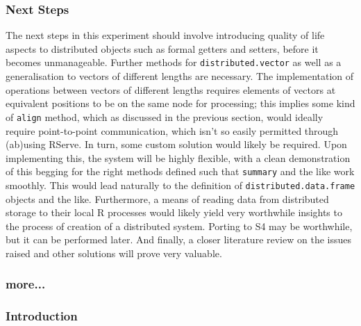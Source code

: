 \hypertarget{next-steps}{%
\subsubsection{Next Steps}\label{next-steps}}

The next steps in this experiment should involve introducing quality of
life aspects to distributed objects such as formal getters and setters,
before it becomes unmanageable. Further methods for
\texttt{distributed.vector} as well as a generalisation to vectors of
different lengths are necessary. The implementation of operations
between vectors of different lengths requires elements of vectors at
equivalent positions to be on the same node for processing; this implies
some kind of \texttt{align} method, which as discussed in the previous
section, would ideally require point-to-point communication, which isn't
so easily permitted through (ab)using RServe. In turn, some custom
solution would likely be required. Upon implementing this, the system
will be highly flexible, with a clean demonstration of this begging for
the right methods defined such that \texttt{summary} and the like work
smoothly. This would lead naturally to the definition of
\texttt{distributed.data.frame} objects and the like. Furthermore, a
means of reading data from distributed storage to their local R
processes would likely yield very worthwhile insights to the process of
creation of a distributed \R system. Porting to S4 may be worthwhile, but
it can be performed later. And finally, a closer literature review on
the issues raised and other solutions will prove very valuable.

\subsubsection{more...}

\hypertarget{introduction}{%
\subsubsection{Introduction}\label{introduction}}

